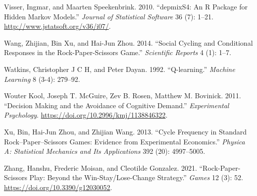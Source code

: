 \documentclass[smallextended]{svjour3}       %
\newlength{\cslhangindent}
\newenvironment{CSLReferences}[2] %
 {%
  \setlength{\parindent}{0pt}
  \ifodd #1 \everypar{\setlength{\hangindent}{\cslhangindent}}\ignorespaces\fi
  \ifnum #2 > 0
  \setlength{\parskip}{#2\baselineskip}
  \fi
 }%
 {}
\begin{document}
\begin{CSLReferences}{1}{0}
\leavevmode{}%
Visser, Ingmar, and Maarten Speekenbrink. 2010. {``{depmixS4}: An {R}
Package for Hidden Markov Models.''} \emph{Journal of Statistical
Software} 36 (7): 1--21. \url{http://www.jstatsoft.org/v36/i07/}.

\leavevmode{}%
Wang, Zhijian, Bin Xu, and Hai-Jun Zhou. 2014. {``Social Cycling and
Conditional Responses in the Rock-Paper-Scissors Game.''}
\emph{Scientific Reports} 4 (1): 1--7.

\leavevmode{}%
Watkins, Christopher J C H, and Peter Dayan. 1992. {``{Q-learning}.''}
\emph{Machine Learning} 8 (3-4): 279--92.

\leavevmode{}%
Wouter Kool, Joseph T. McGuire, Zev B. Rosen, Matthew M. Bovinick. 2011.
{``{Decision Making and the Avoidance of Cognitive Demand}.''}
\emph{Experimental Psychology}.
\url{https://doi.org/10.2996/kmj/1138846322}.

\leavevmode{}%
Xu, Bin, Hai-Jun Zhou, and Zhijian Wang. 2013. {``Cycle Frequency in
Standard Rock--Paper--Scissors Games: Evidence from Experimental
Economics.''} \emph{Physica A: Statistical Mechanics and Its
Applications} 392 (20): 4997--5005.

\leavevmode{}%
Zhang, Hanshu, Frederic Moisan, and Cleotilde Gonzalez. 2021.
{``Rock-{Paper}-{Scissors Play}: Beyond the {Win}-{Stay}/{Lose}-{Change
Strategy}.''} \emph{Games} 12 (3): 52.
\url{https://doi.org/10.3390/g12030052}.

\end{CSLReferences}




\end{document}
